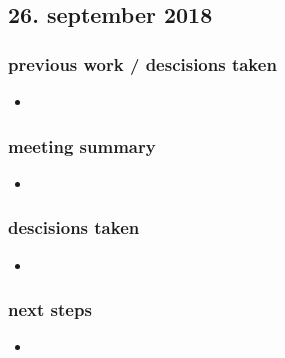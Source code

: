 \documentclass{article}
\begin{document}
        
    
\subsection{26. september 2018}

\subsubsection{previous work / descisions taken}
\begin{itemize}
    \item
\end{itemize}

\subsubsection{meeting summary}
\begin{itemize}
    \item 
\end{itemize}

\subsubsection{descisions taken}
\begin{itemize}
    \item 
\end{itemize}

\subsubsection{next steps}
\begin{itemize}
    \item
\end{itemize}
\end{document}
